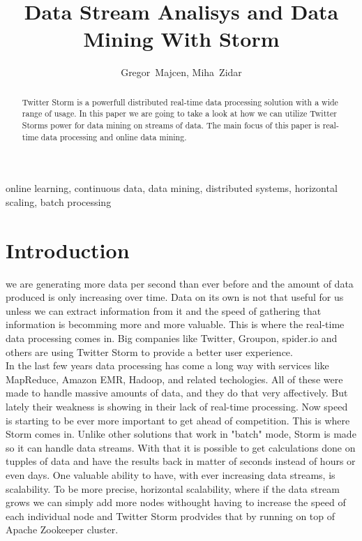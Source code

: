 \documentclass[journal]{IEEEtran/IEEEtran}
\begin{document}
\title{Data Stream Analisys and Data Mining With Storm}

\author{Gregor~Majcen, Miha~Zidar}%
\maketitle
\begin{abstract}
    Twitter Storm is a powerfull distributed real-time data processing solution with a wide range of usage. In this paper we are going to take a look at how we can utilize Twitter Storms power for data mining on streams of data. The main focus of this paper is real-time data processing and online data mining.
\end{abstract}

\begin{IEEEkeywords}
    online learning, continuous data, data mining, distributed systems, horizontal scaling, batch processing
\end{IEEEkeywords}

\IEEEpeerreviewmaketitle


\section{Introduction}
 we are generating more data per second than ever before and the amount of data produced is only increasing over time. Data on its own is not that useful for us unless we can extract information from it and the speed of gathering that information is becomming more and more valuable. This is where the real-time data processing comes in. Big companies like Twitter, Groupon, spider.io and others are using Twitter Storm to provide a better user experience.\\

In the last few years data processing has come a long way with services like MapReduce, Amazon EMR, Hadoop, and related techologies. All of these were made to handle massive amounts of data, and they do that very affectively. But lately their weakness is showing in their lack of real-time processing. Now speed is starting to be ever more important to get ahead of competition. This is where Storm comes in. Unlike other solutions that work in "batch" mode, Storm is made so it can handle data streams. With that it is possible to get calculations done on tupples of data and have the results back in matter of seconds instead of hours or even days. One valuable ability to have, with ever increasing data streams, is scalability. To be more precise, horizontal scalability, where if the data stream grows we can simply add more nodes withought having to increase the speed of each individual node and Twitter Storm prodvides that by running on top of Apache Zookeeper cluster.
\end{document}
